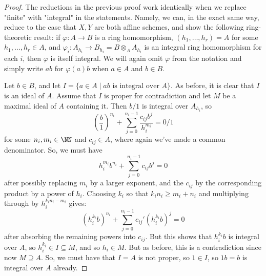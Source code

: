 \begin{proof}
	The reductions in the previous proof work identically when we replace "finite" with "integral" in the statements. Namely, we can, in the exact same way, reduce to the case that $X,Y$ are both affine schemes, and show the following ring-theoretic result: if $\varphi : A \to B$ is a ring homomorphism, $(h_1,\ldots,h_r) = A$ for some $h_1,\ldots,h_r \in A$, and $\varphi_i : A_{h_i} \to B_{h_i} = B \otimes_A A_{h_i}$ is an integral ring homomorphism for each $i$, then $\varphi$ is itself integral. We will again omit $\varphi$ from the notation and simply write $ab$ for $\varphi(a)b$ when $a \in A$ and $b \in B$.
	
	Let $b \in B$, and let $I = \{a \in A \mid ab \text{ is integral over } A \}$. As before, it is clear that $I$ is an ideal of $A$. Assume that $I$ is proper for contradiction and let $M$ be a maximal ideal of $A$ containing it. Then $b/1$ is integral over $A_{h_i}$, so
	\[ \left(\frac{b}{1}\right)^{n_i} + \sum_{j=0}^{n_i-1} \frac{c_{ij}b^j}{h_i^{m_i}} = 0/1 \]
	for some $n_i,m_i \in \NN$ and $c_{ij} \in A$, where again we've made a common denominator. So, we must have
	\[ h_i^{m_i}b^{n_i} + \sum_{j=0}^{n_i-1} c_{ij}b^j = 0 \]
	after possibly replacing $m_i$ by a larger exponent, and the $c_{ij}$ by the corresponding product by a power of $h_i$. Choosing $k_i$ so that $k_in_i \geq m_i+n_i$ and multiplying through by $h_i^{k_in_i-m_i}$ gives:
	\[ (h_i^{k_i}b)^{n_i} + \sum_{j=0}^{n_i-1} c_{ij}'(h_i^{k_i}b)^j = 0 \]
	after absorbing the remaining powers into $c_{ij}$. But this shows that $h_i^{k_i}b$ is integral over $A$, so $h_i^{k_i} \in I \subseteq M$, and so $h_i \in M$. But as before, this is a contradiction since now $M \supseteq A$. So, we must have that $I = A$ is not proper, so $1 \in I$, so $1b = b$ is integral over $A$ already.
\end{proof}
